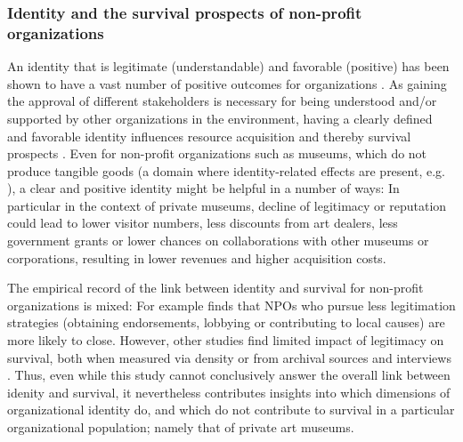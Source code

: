 \documentclass[12pt]{article}
\begin{document}
\subsubsection*{Identity and the survival prospects of non-profit organizations}

An identity that is legitimate (understandable) and favorable (positive) has been shown to have a vast number of positive outcomes for organizations \parencite{Lange_Lee_Dai_2010_reputation}.
As gaining the approval of different stakeholders is necessary for being understood and/or supported by other organizations in the environment, having a clearly defined and favorable identity influences resource acquisition and thereby survival prospects \parencite{Rao_1994_reputation}.
Even for non-profit organizations such as museums, which do not produce tangible goods (a domain where identity-related effects are present, e.g. \cite{Hsu_2015_granted,Bogaert_etal_2014_ecological}), a clear and positive identity might be helpful in a number of ways:
In particular in the context of private museums, decline of legitimacy or reputation could lead to lower visitor numbers, less discounts from art dealers, less government grants or lower chances on collaborations with other museums or corporations, resulting in lower revenues and higher acquisition costs.


The empirical record of the link between identity and survival for non-profit organizations is mixed: 
For example \textcite{Bielefeld_1994_survival} finds that NPOs who pursue less legitimation strategies (obtaining endorsements, lobbying or contributing to local causes) are more likely to close.
However, other studies find limited impact of legitimacy on survival, both when measured via density \parencite{Bogaert_etal_2014_ecological} or from archival sources and interviews \parencite{Fernandez_2007_dissolution}.
Thus, even while this study cannot conclusively answer the overall link between idenity and survival, it nevertheless contributes insights into which dimensions of organizational identity do, and which do not contribute to survival in a particular organizational population; namely that of private art museums.
\end{document}
